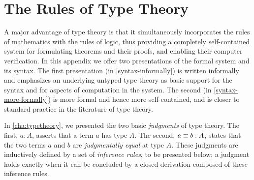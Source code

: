 \chapter{The Rules of Type Theory}
\label{cha:rules}
\bgroup %

\newcommand{\ctx}{\ \mathsf{ctx}}
\newcommand{\emptyctx}{\ensuremath{\cdot}}

\newcommand{\production}{\vcentcolon\vcentcolon=}

\newcommand{\mkbox}[1]{\ensuremath{#1}}

\newcommand{\app}{\mathsf{app}}

\newcommand{\gothic}{\mathfrak}
\newcommand{\gP}{{\gothic p}}
\newcommand{\gM}{{\gothic M}}
\newcommand{\gN}{{\gothic N}}
\newcommand{\rats}{\mathbb{Q}}
\newcommand{\ints}{\mathbb{Z}}

\newcommand{\lbr}{\lbrack\!\lbrack}
\newcommand{\rbr}{\rbrack\!\rbrack}
\newcommand{\sem}[2] {\lbr #1 \rbr_{#2}}  %
\newcommand{\APP}[2] {{\sf app}(#1,#2)}  %
\newcommand{\nats}{\mathbb{N}}
\newcommand{\Con}{{\sf Con}}
\newcommand{\Elem}{{\sf Elem}}
\newcommand{\myId}{1}
\newcommand{\mypp}{{\sf p}}
\newcommand{\qq}{{\sf q}}
\newcommand{\mySp}{{\sf Sp}}
\newcommand{\conv}{\sim}
\newcommand{\LIM}{{\sf lim}}
\newcommand{\nn}{{\sf n}}
\newcommand{\Fam}{{\sf Fam}}

A major advantage of type theory is that it 
simultaneously incorporates the rules of mathematics with the rules of logic,
thus providing a completely self-contained system for formulating theorems
and their proofs, and enabling their computer verification.  In this appendix we
offer two presentations of the formal system and its syntax.  The first
presentation (in \autoref{syntax-informally}) is written informally and
emphasizes an underlying untyped type theory as basic support for the syntax
and for aspects of computation in the system.  The second (in
\autoref{syntax-more-formally}) is more formal and hence more self-contained,
and is closer to standard practice in the literature of type theory.

In \autoref{cha:typetheory}, we presented the two basic {\em judgments} of type
theory. The first, $a:A$, asserts that a term $a$ has type $A$.  The second,
$a\equiv b:A$, states that the two terms $a$ and $b$ are {\em judgmentally equal}
at type $A$. These judgments are inductively defined by a set of {\em inference
rules}, to be presented below; a judgment holds exactly when it can be concluded
by a closed derivation composed of these inference rules.

